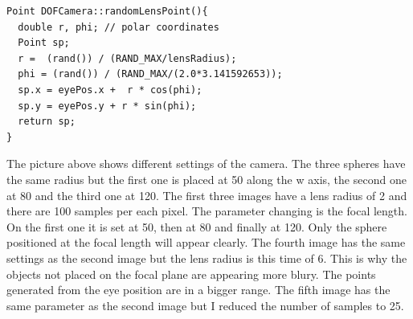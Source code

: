 \documentclass[a4paper,11.5pt]{article}
\theoremstyle{mytheor}
\begin{document}
\begin{lstlisting}
Point DOFCamera::randomLensPoint(){
  double r, phi; // polar coordinates
  Point sp;
  r =  (rand()) / (RAND_MAX/lensRadius);
  phi = (rand()) / (RAND_MAX/(2.0*3.141592653));
  sp.x = eyePos.x +  r * cos(phi);
  sp.y = eyePos.y + r * sin(phi);
  return sp;
}

\end{lstlisting}
\begin{figure}[H]
\centering
{}
\end{figure}
The picture above shows different settings of the camera. The three spheres have the same radius but the first one is placed at 50 along the w axis, the second one at 80 and the third one at 120. The first three images have a lens radius of 2 and there are 100 samples per each pixel. The parameter changing is the focal length. On the first one it is set at 50, then at 80 and finally at 120. Only the sphere positioned at the focal length will appear clearly. The fourth image has the same settings as the second image but the lens radius is this time of 6. This is why the objects not placed on the focal plane are appearing more blury. The points generated from the eye position are in a bigger range. The fifth image has the same parameter as the second image but I reduced the number of samples to 25. 
\end{document}
